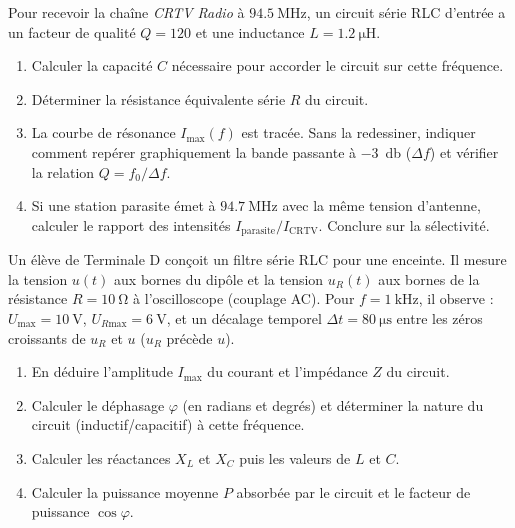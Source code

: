 \documentclass[11pt]{article}
\begin{document}
\begin{exercice}
Pour recevoir la chaîne \textit{CRTV Radio} à $\SI{94.5}{\mega\hertz}$, un circuit série RLC d'entrée a un facteur de qualité $Q=120$ et une inductance $L=\SI{1.2}{\micro\henry}$.
\begin{enumerate}
    \item Calculer la capacité $C$ nécessaire pour accorder le circuit sur cette fréquence.
    \item Déterminer la résistance équivalente série $R$ du circuit.
    \item La courbe de résonance $I_{\text{max}}(f)$ est tracée. Sans la redessiner, indiquer comment repérer graphiquement la bande passante à \SI{-3}{\decibel} ($\Delta f$) et vérifier la relation $Q = f_0 / \Delta f$.
    \item Si une station parasite émet à $\SI{94.7}{\mega\hertz}$ avec la même tension d'antenne, calculer le rapport des intensités $I_{\text{parasite}}/I_{\text{CRTV}}$. Conclure sur la sélectivité.
\end{enumerate}
\end{exercice}

\begin{exercice}
Un élève de Terminale D conçoit un filtre série RLC pour une enceinte. Il mesure la tension $u(t)$ aux bornes du dipôle et la tension $u_R(t)$ aux bornes de la résistance $R=\SI{10}{\ohm}$ à l'oscilloscope (couplage AC). Pour $f=\SI{1}{\kilo\hertz}$, il observe : $U_{\text{max}}=\SI{10}{\volt}$, $U_{R\text{max}}=\SI{6}{\volt}$, et un décalage temporel $\Delta t = \SI{80}{\micro\second}$ entre les zéros croissants de $u_R$ et $u$ ($u_R$ précède $u$).
\begin{enumerate}
    \item En déduire l'amplitude $I_{\text{max}}$ du courant et l'impédance $Z$ du circuit.
    \item Calculer le déphasage $\varphi$ (en radians et degrés) et déterminer la nature du circuit (inductif/capacitif) à cette fréquence.
    \item Calculer les réactances $X_L$ et $X_C$ puis les valeurs de $L$ et $C$.
    \item Calculer la puissance moyenne $P$ absorbée par le circuit et le facteur de puissance $\cos\varphi$.
\end{enumerate}
\end{exercice}
\end{document}
